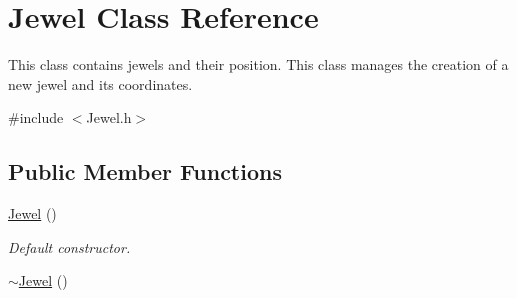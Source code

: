 \hypertarget{classJewel}{}\section{Jewel Class Reference}
\label{classJewel}


This class contains jewels and their position. This class manages the creation of a new jewel and its coordinates.  




{\ttfamily \#include $<$Jewel.\+h$>$}

\subsection*{Public Member Functions}
\begin{DoxyCompactItemize}
\item 
\hyperlink{classJewel_adb354506657192146a6cbc40c11a8a12}{Jewel} ()\hypertarget{classJewel_adb354506657192146a6cbc40c11a8a12}{}\label{classJewel_adb354506657192146a6cbc40c11a8a12}

\begin{DoxyCompactList}\small\item\em Default constructor. \end{DoxyCompactList}\item 
\hyperlink{classJewel_aa8697a078d9cbbf994545a0e239ce83e}{$\sim$\+Jewel} ()\hypertarget{classJewel_aa8697a078d9cbbf994545a0e239ce83e}{}\label{classJewel_aa8697a078d9cbbf994545a0e239ce83e}


\end{DoxyCompactItemize}
